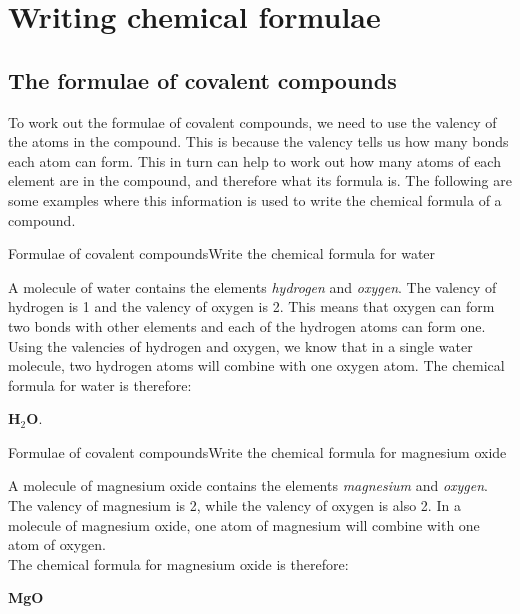 



\section{Writing chemical formulae}

\subsection{The formulae of covalent compounds}

To work out the formulae of covalent compounds, we need to use the valency of the atoms in the compound. This is because the valency tells us how many bonds each atom can form. This in turn can help to work out how many atoms of each element are in the compound, and therefore what its formula is. The following are some examples where this information is used to write the chemical formula of a compound.\\

\begin{wex}{Formulae of covalent compounds}{Write the chemical formula for water\\}
{
A molecule of water contains the elements \textit{hydrogen} and \textit{oxygen}.
The valency of hydrogen is 1 and the valency of oxygen is 2. This means that oxygen can form two bonds with other elements and each of the hydrogen atoms can form one.
Using the valencies of hydrogen and oxygen, we know that in a single water molecule, two hydrogen atoms will combine with one oxygen atom. The chemical formula for water is therefore:
\begin{center}
\textbf{H$_2$O}.
\end{center}}
\end{wex}

\begin{wex}{Formulae of covalent compounds}{Write the chemical formula for magnesium oxide\\}
{
 A molecule of magnesium oxide contains the elements \textit{magnesium} and \textit{oxygen}.  
The valency of magnesium is 
2, while the valency of oxygen is also 2. In a molecule of magnesium oxide, one atom of magnesium will combine with one atom 
of oxygen. \\
The chemical formula for magnesium oxide is therefore: 

\begin{center}
\textbf{MgO}
\end{center}}
\end{wex}

